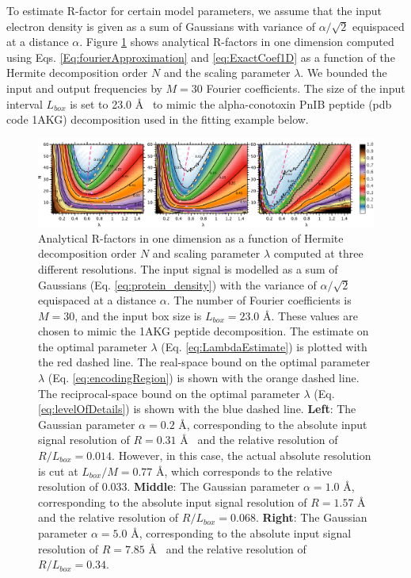 To estimate R-factor for certain model parameters, we assume that the input electron density is given as a sum of Gaussians with variance of $\alpha/\sqrt{2}$ equispaced at a distance $\alpha$.
Figure \ref{fig:RfactorsVsNVsLambda} shows analytical R-factors in one dimension computed using Eqs. \ref{Eq:fourierApproximation} and \ref{eq:ExactCoef1D}
as a function of the Hermite decomposition order $N$ and the scaling parameter $\lambda$.
We bounded the input and output frequencies by $M=30$ Fourier coefficients. The size of the input interval $L_{box}$ is set to 23.0 \AA ~ to mimic
the alpha-conotoxin PnIB peptide (pdb code 1AKG) decomposition used in the fitting example below.

\begin{figure}[h]
\label{fig:RfactorsVsNVsLambda}
\includegraphics[width=\textwidth]{Hermite/Fig/RfactorsLamN.pdf}
\caption[Analytical R-factors]{
Analytical R-factors in one dimension as a function of Hermite decomposition order $N$ and scaling parameter $\lambda$ computed at three different resolutions.
The input signal is modelled as a sum of Gaussians (Eq. \ref{eq:protein_density}) with the variance of $\alpha/\sqrt{2}$ equispaced at a distance $\alpha$. The number of Fourier coefficients is $M=30$, and the input box size is $L_{box}=23.0$ \AA.  These values are chosen to mimic
the 1AKG peptide decomposition. The estimate on the optimal parameter $\lambda$ (Eq. \ref{eq:LambdaEstimate}) is plotted with the red dashed line. 
The real-space bound on the optimal parameter $\lambda$  (Eq. \ref{eq:encodingRegion}) is shown with the orange dashed line. The reciprocal-space bound on the optimal parameter $\lambda$  (Eq. \ref{eq:levelOfDetails}) is shown with the blue dashed line.
{\bf Left}: The Gaussian parameter $\alpha=0.2$ \AA, corresponding to the absolute input signal resolution of $R=0.31$ \AA~ and the relative resolution of  $R/L_{box}=0.014$. However, in this case, the actual absolute resolution is cut at $L_{box}/M=0.77$ \AA, which corresponds to the relative resolution of 0.033.
{\bf Middle}: The Gaussian parameter $\alpha=1.0$ \AA, corresponding to the absolute input signal resolution of $R=1.57$ \AA~ and the relative resolution of  $R/L_{box}=0.068$.
{\bf Right}: The Gaussian parameter $\alpha=5.0$ \AA, corresponding to the absolute input signal resolution of $R=7.85$ \AA~ and the relative resolution of  $R/L_{box}=0.34$.
}
\end{figure}

